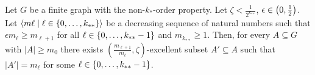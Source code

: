     \lemma[Claim 5.4.1]\label{existance_of_excellent_subsets_fixed_size_choices}
        Let $G$ be a finite graph with the non-$k_{*}$-order property.
        Let $\zeta < \frac{1}{2^{k_{**}}}$, $\epsilon \in \left( 0, \frac{1}{2} \right)$.
        Let $\left< m\ell \mid \ell \in \left\{ 0, \dots, k_{**} \right\} \right>$ be a decreasing sequence of natural numbers such that
        $\epsilon m_{\ell} \geq m_{\ell+1}$ for all $\ell \in \left\{ 0, \dots, k_{**}-1 \right\}$ and $m_{k_{**}} \geq 1$.
        Then, for every $A \subseteq G$ with $|A| \geq m_0$ there exists
        $\left(\frac{m_{\ell+1}}{m_{\ell}}, \zeta\right)$-excellent subset $A' \subseteq A$ such that $|A'| = m_\ell$ for
        some $\ell \in \left\{ 0, \dots, k_{**}-1 \right\}$.
